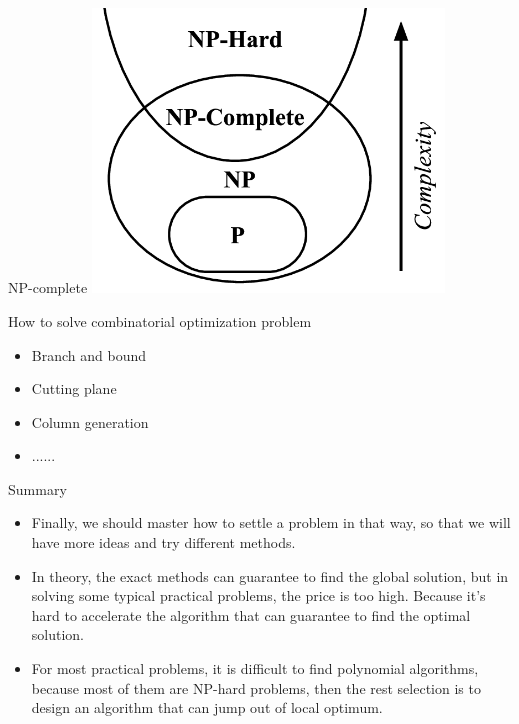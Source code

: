    \begin{frame}{NP-complete}
     \centering
     \includegraphics[width = 0.7\textwidth]{images/NP.png}
   \end{frame}

   \begin{frame}{How to solve combinatorial optimization problem}
     \Large
     \begin{spacing}{1.5}
       \begin{itemize}
         \item Branch and bound
         \item Cutting plane
         \item Column generation
         \item ......
       \end{itemize}
     \end{spacing}
   \end{frame}


   \begin{frame}{Summary}

     \begin{itemize}
       \item \textcolor{yellow}{}

       Finally, we should master how to settle a problem in that way, so that we will have more ideas and try different methods.

       \item \textcolor{yellow}{}

       In theory, the exact methods can guarantee to find the global solution, but in solving some typical practical problems, the price is too high. Because it's hard to accelerate the algorithm that can guarantee to find the optimal solution.

       \item \textcolor{yellow}{}

       For most practical problems, it is difficult to find polynomial algorithms, because most of them are NP-hard problems, then the rest selection is to design an algorithm that can jump out of local optimum.

     \end{itemize}
   \end{frame}
